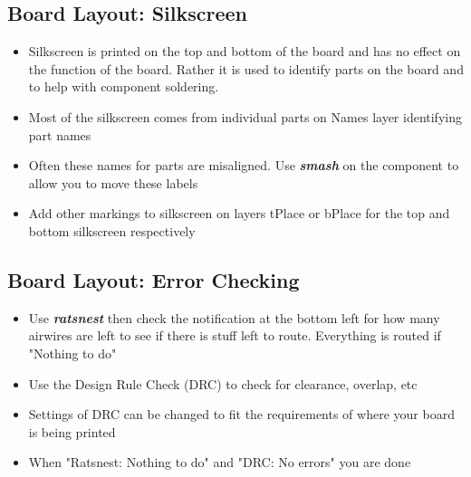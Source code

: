 \documentclass{article}
\begin{document}
\subsection{Board Layout: Silkscreen}
\begin{itemize}
    \item Silkscreen is printed on the top and bottom of the board and has no effect on the function of the board. Rather it is used to identify parts on the board and to help with component soldering.
    \item Most of the silkscreen comes from individual parts on Names layer identifying part names
    \item Often these names for parts are misaligned. Use
    \textit{\textbf{smash}} on the component to allow you to move these labels
    \item Add other markings to silkscreen on layers tPlace or bPlace for the top and bottom silkscreen respectively
\end{itemize}

\subsection{Board Layout: Error Checking}
\begin{itemize}
    \item Use \textit{\textbf{ratsnest}} then check the notification at the bottom left for how many airwires are left to see if there is stuff left to route. Everything is routed if "Nothing to do"
    \item Use the Design Rule Check (DRC) to check for clearance, overlap, etc
    \item Settings of DRC can be changed to fit the requirements of where your board is being printed
    \item When "Ratsnest: Nothing to do" and "DRC: No errors" you are done
\end{itemize}
\end{document}
